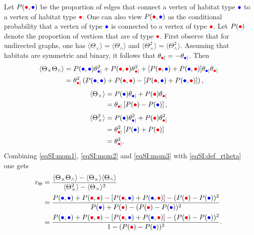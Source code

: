 Let $P(\rcirc,\bcirc)$ be the proportion of edges that connect a vertex of habitat type $\bcirc$ to a vertex of habitat type $\rcirc$. One can also view $P(\rcirc,\bcirc)$ as the conditional probability that a vertex of type $\bcirc$ is connected to a vertex of type $\rcirc$. Let $P(\rcirc)$ denote the proportion of vertices that are of type $\rcirc$. 
%
First observe that for undirected graphs, one has $ \langle \Theta_\times \rangle  = \langle \Theta_\wedge \rangle$ and $ \langle \Theta_\times^2 \rangle  = \langle \Theta_\wedge^2 \rangle$.
%
Assuming that habitats are symmetric and binary, it follows that $\theta_{\rcirc|} = -\theta_{\bcirc|}$. Then
\begin{equation}\label{eqSI:mom1}
  \begin{split}
    \langle \Theta_\times\Theta_\wedge \rangle &=P(\bcirc,\bcirc)\theta_{\bcirc|}^2 + P(\rcirc,\rcirc)\theta_{\rcirc|}^2 + [ P(\rcirc,\bcirc) + P(\bcirc,\rcirc)]\theta_{\bcirc|}\theta_{\rcirc|}  \\
    &= \theta_{\rcirc|}^2 \left( P(\bcirc,\bcirc) + P(\rcirc,\rcirc) -  [ P(\rcirc,\bcirc) + P(\bcirc,\rcirc)] \right) ,
  \end{split}
\end{equation}
\begin{equation}\label{eqSI:mom2}
  \begin{split}
    \langle \Theta_\times \rangle &=  P(\bcirc)\theta_{\bcirc|} + P(\rcirc)\theta_{\rcirc|}\\
    &= \theta_{\rcirc|} \left[ P(\rcirc) - P(\bcirc)\right],
  \end{split}
\end{equation}
\begin{equation}\label{eqSI:mom3}
  \begin{split}
    \langle \Theta_\times^2 \rangle &=  P(\bcirc)\theta_{\bcirc|}^2 + P(\rcirc)\theta_{\rcirc|}^2\\
    &= \theta_{\rcirc|}^2 \left[ P(\bcirc) + P(\rcirc) \right] \\
    &= \theta_{\rcirc|}^2 .
  \end{split}
\end{equation}
Combining \cref{eqSI:mom1}, \cref{eqSI:mom2} and \cref{eqSI:mom3} with \cref{eqSI:def_rtheta} one gets
\begin{equation}
  \begin{split}
    r_\Theta
    &= \frac{\langle  \Theta_\times \Theta_\wedge \rangle - \langle  \Theta_\times \rangle \langle  \Theta_\wedge \rangle }{  \langle \Theta_\times^2 \rangle - \langle \Theta_\times \rangle^2}\\
    &= \frac{ P(\bcirc,\bcirc) + P(\rcirc,\rcirc) -  [ P(\rcirc,\bcirc) + P(\bcirc,\rcirc)] - (P(\rcirc) - P(\bcirc))^2}{P(\bcirc) + P(\rcirc) - (P(\rcirc) - P(\bcirc))^2} \\
    &= \frac{ P(\bcirc,\bcirc) + P(\rcirc,\rcirc)  - [ P(\rcirc,\bcirc) + P(\bcirc,\rcirc)] - (P(\rcirc) - P(\bcirc))^2}{1- (P(\rcirc) - P(\bcirc))^2}.
  \end{split}
\end{equation}
